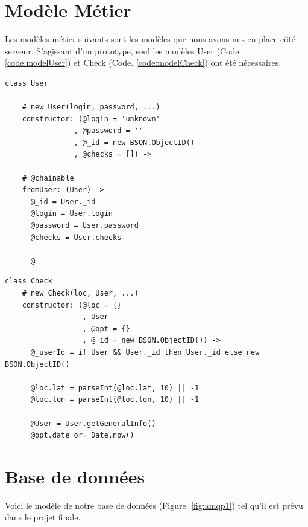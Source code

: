 \documentclass[a4paper,12pt]{report}
\begin{document}
\begin{onehalfspace}
\section{Modèle Métier}
Les modèles métier suivants sont les modèles que nous avons mis en place côté serveur. S'agissant d'un prototype, seul les modèles User (Code. \ref{code:modelUser}) et Check (Code. \ref{code:modelCheck}) ont été nécessaires.

\begin{lstlisting}[float=htb, frame=lines, caption={Model User}, label={code:modelUser}]
class User

    # new User(login, password, ...)
    constructor: (@login = 'unknown'
                , @password = ''
                , @_id = new BSON.ObjectID()
                , @checks = []) ->

    # @chainable
    fromUser: (User) ->
      @_id = User._id
      @login = User.login
      @password = User.password
      @checks = User.checks

      @
\end{lstlisting}

\begin{lstlisting}[float=htb, frame=lines, caption={Model Check}, label={code:modelCheck}]
class Check
    # new Check(loc, User, ...)
    constructor: (@loc = {}
                  , User
                  , @opt = {}
                  , @_id = new BSON.ObjectID()) ->
      @_userId = if User && User._id then User._id else new BSON.ObjectID()

      @loc.lat = parseInt(@loc.lat, 10) || -1
      @loc.lon = parseInt(@loc.lon, 10) || -1

      @User = User.getGeneralInfo()
      @opt.date or= Date.now()
\end{lstlisting}


\section{Base de données}
Voici le modèle de notre base de données (Figure. \ref{fig:amqp1}) tel qu'il est prévu dans le projet finale.


\end{onehalfspace}
\end{document}
